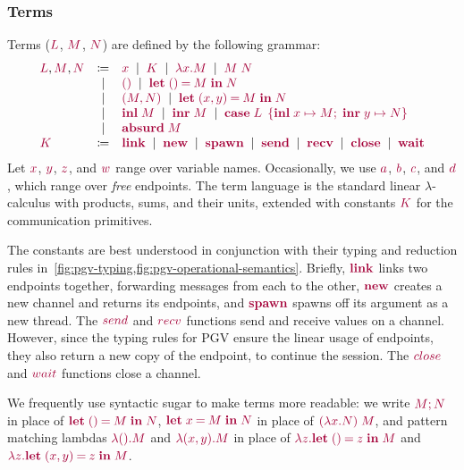 \documentclass[main.tex]{subfiles}
\begin{document}
\subsubsection*{Terms}
Terms ($\tm{L}$, $\tm{M}$, $\tm{N}$) are defined by the following grammar:
\[
\begin{array}{lcl}
  \tm{L}, \tm{M}, \tm{N}
  & \coloneqq & \tm{x}
    \sep        \tm{K}
    \sep        \tm{\lambda x.M}
    \sep        \tm{M\;N} \\
  & \sep      & \tm{\unit}
    \sep        \tm{\letunit{M}{N}} \\
  & \sep      & \tm{\pair{M}{N}}
    \sep        \tm{\letpair{x}{y}{M}{N}} \\
  & \sep      & \tm{\inl{M}}
    \sep        \tm{\inr{M}}
    \sep        \tm{\casesum{L}{x}{M}{y}{N}} \\
  & \sep      & \tm{\absurd{M}} \\
  \tm{K}
  & \coloneqq & \tm{\link}
    \sep        \tm{\new}
    \sep        \tm{\spawn}
    \sep        \tm{\send}
    \sep        \tm{\recv}
    \sep        \tm{\close}
    \sep        \tm{\wait}
\end{array}
\]
Let $\tm{x}$, $\tm{y}$, $\tm{z}$, and $\tm{w}$ range over variable names. Occasionally, we use $\tm{a}$, $\tm{b}$, $\tm{c}$, and $\tm{d}$, which range over \emph{free} endpoints. The term language is the standard linear $\lambda$-calculus with products, sums, and their units, extended with constants $\tm{K}$ for the communication primitives. 

The constants are best understood in conjunction with their typing and reduction rules in~\cref{fig:pgv-typing,fig:pgv-operational-semantics}. Briefly, $\tm{\link}$ links two endpoints together, forwarding messages from each to the other, $\tm{\new}$ creates a new channel and returns its endpoints, and $\tm{\spawn}$ spawns off its argument as a new thread. The $\tm{send}$ and $\tm{recv}$ functions send and receive values on a channel. However, since the typing rules for PGV ensure the linear usage of endpoints, they also return a new copy of the endpoint, to continue the session. The $\tm{close}$ and $\tm{wait}$ functions close a channel.

We frequently use syntactic sugar to make terms more readable: we write $\tm{\andthen{M}{N}}$ in place of $\tm{\letunit{M}{N}}$, $\tm{\letbind{x}{M}{N}}$ in place of $\tm{(\lambda x.N)\;M}$, and pattern matching lambdas $\tm{\lambda\unit.M}$ and $\tm{\lambda\pair{x}{y}.M}$ in place of $\tm{\lambda z.\letunit{z}{M}}$ and $\tm{\lambda z.\letpair{x}{y}{z}{M}}$.
\end{document}
